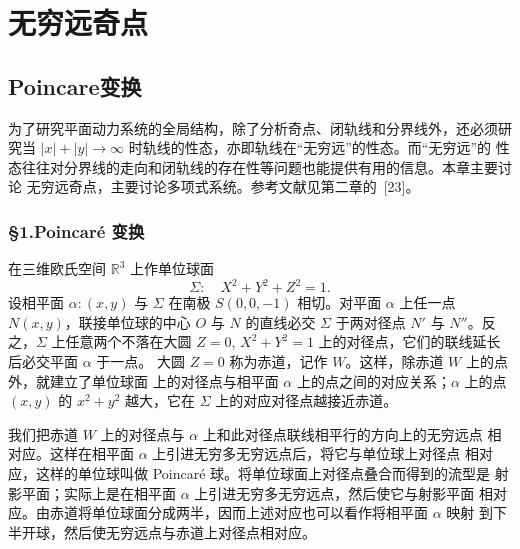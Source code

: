 
\setchapterimage{}
\setchapterintro{}
\chapter{无穷远奇点}

\newcommand{\chFiveFigurePlaceholder}[1]{%
  \begin{center}
    \fbox{\parbox{0.72\textwidth}{\centering\vspace{2.4cm}图~#1\\（图片占位）\vspace{2.4cm}}}
  \end{center}%
}

\section{Poincare变换}

为了研究平面动力系统的全局结构，除了分析奇点、闭轨线和分界线外，还必须研究当
$|x|+|y|\to\infty$ 时轨线的性态，亦即轨线在“无穷远”的性态。而“无穷远”的
性态往往对分界线的走向和闭轨线的存在性等问题也能提供有用的信息。本章主要讨论
无穷远奇点，主要讨论多项式系统。参考文献见第二章的~[23]。

\subsection*{\S 1.\quad Poincar\'e 变换}

在三维欧氏空间 $\mathbb{R}^3$ 上作单位球面
\[
  \Sigma:\quad X^2+Y^2+Z^2=1.
\]
设相平面 $\alpha:(x,y)$ 与 $\Sigma$ 在南极 $S(0,0,-1)$ 相切。对平面
$\alpha$ 上任一点 $N(x,y)$，联接单位球的中心 $O$ 与 $N$ 的直线必交
$\Sigma$ 于两对径点 $N'$ 与 $N''$。反之，$\Sigma$ 上任意两个不落在大圆
$Z=0$, $X^2+Y^2=1$ 上的对径点，它们的联线延长后必交平面 $\alpha$ 于一点。
大圆 $Z=0$ 称为赤道，记作 $W$。这样，除赤道 $W$ 上的点外，就建立了单位球面
上的对径点与相平面 $\alpha$ 上的点之间的对应关系；$\alpha$ 上的点 $(x,y)$ 的
$x^2+y^2$ 越大，它在 $\Sigma$ 上的对应对径点越接近赤道。

我们把赤道 $W$ 上的对径点与 $\alpha$ 上和此对径点联线相平行的方向上的无穷远点
相对应。这样在相平面 $\alpha$ 上引进无穷多无穷远点后，将它与单位球上对径点
相对应，这样的单位球叫做 Poincar\'e 球。将单位球面上对径点叠合而得到的流型是
射影平面；实际上是在相平面 $\alpha$ 上引进无穷多无穷远点，然后使它与射影平面
相对应。由赤道将单位球面分成两半，因而上述对应也可以看作将相平面 $\alpha$ 映射
到下半开球，然后使无穷远点与赤道上对径点相对应。

